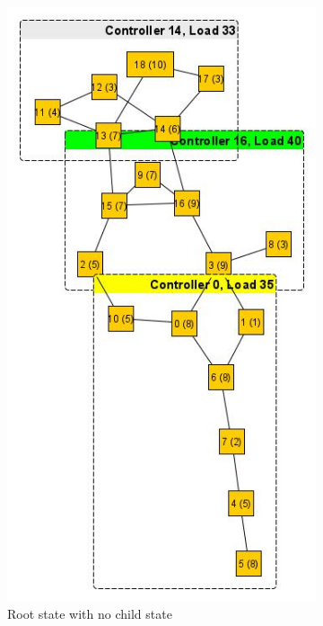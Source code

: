 \documentclass{IEEEtran}
\begin{document}
\begin{figure}
\begin{subfigure}{0.35\textwidth}
			\includegraphics[width=\linewidth]{Images/Aarnet_Load_1.jpg}
			\caption{Root state with no child state}
			\label{fig:aarnet2009l1}
		\end{subfigure}
		~
		\begin{subfigure}{0.9\textwidth}

\end{subfigure}
\end{figure}
\end{document}
